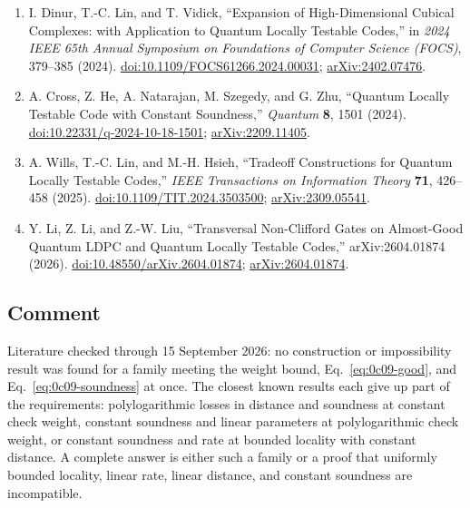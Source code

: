 \begin{enumerate}[label={},leftmargin=4.8em,labelsep=0.5em]
  \footnotesize
  \item[\textup{[DLV24]}]\label{ref:0c09-dlv}
  I. Dinur, T.-C. Lin, and T. Vidick, ``Expansion of High-Dimensional
Cubical Complexes: with Application to Quantum Locally Testable Codes,'' in
\emph{2024 IEEE 65th Annual Symposium on Foundations of Computer Science
(FOCS)}, 379--385 (2024).
\href{https://doi.org/10.1109/FOCS61266.2024.00031}{doi:10.1109/FOCS61266.2024.00031};
\href{https://arxiv.org/abs/2402.07476}{arXiv:2402.07476}.

  \item[\textup{[CHN+24]}]\label{ref:0c09-chnsz}
  A. Cross, Z. He, A. Natarajan, M. Szegedy, and G. Zhu, ``Quantum Locally
Testable Code with Constant Soundness,'' \emph{Quantum} \textbf{8}, 1501
(2024).
\href{https://doi.org/10.22331/q-2024-10-18-1501}{doi:10.22331/q-2024-10-18-1501};
\href{https://arxiv.org/abs/2209.11405}{arXiv:2209.11405}.

  \item[\textup{[WLH25]}]\label{ref:0c09-wlh}
  A. Wills, T.-C. Lin, and M.-H. Hsieh, ``Tradeoff Constructions for Quantum
Locally Testable Codes,'' \emph{IEEE Transactions on Information Theory}
\textbf{71}, 426--458 (2025).
\href{https://doi.org/10.1109/TIT.2024.3503500}{doi:10.1109/TIT.2024.3503500};
\href{https://arxiv.org/abs/2309.05541}{arXiv:2309.05541}.

  \item[\textup{[LLL26]}]\label{ref:0c09-lll}
  Y. Li, Z. Li, and Z.-W. Liu, ``Transversal Non-Clifford Gates on
Almost-Good Quantum LDPC and Quantum Locally Testable Codes,''
arXiv:2604.01874 (2026).
\href{https://doi.org/10.48550/arXiv.2604.01874}{doi:10.48550/arXiv.2604.01874};
\href{https://arxiv.org/abs/2604.01874}{arXiv:2604.01874}.
\end{enumerate}

\subsection*{Comment}

Literature checked through 15 September 2026: no construction or
impossibility result was found for a family meeting the weight bound,
Eq.~\eqref{eq:0c09-good}, and Eq.~\eqref{eq:0c09-soundness} at once.  The
closest known results each give up part of the requirements: polylogarithmic
losses in distance and soundness at constant check weight, constant soundness
and linear parameters at polylogarithmic check weight, or constant soundness
and rate at bounded locality with constant distance.  A complete answer is
either such a family or a proof
that uniformly bounded locality, linear rate, linear distance, and constant
soundness are incompatible.

